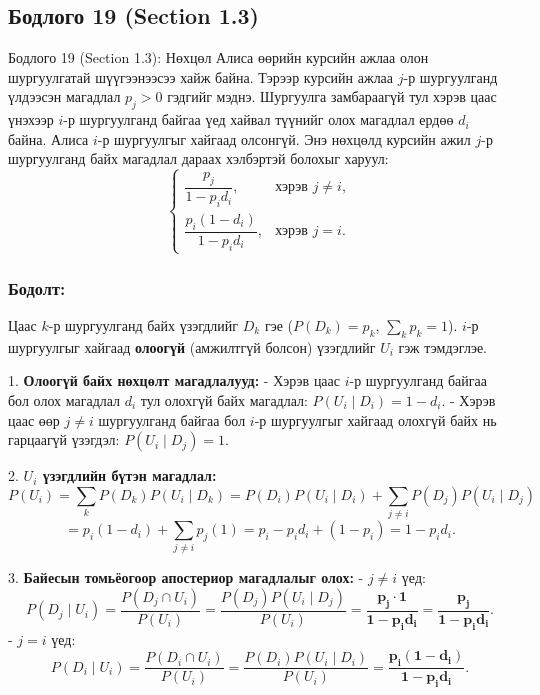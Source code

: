 \documentclass[11pt,a4paper]{article}
\begin{document}
\vspace{0.8em}

\subsection*{Бодлого 19 (Section 1.3)}

\begin{problembox}{Бодлого 19 (Section 1.3): Нөхцөл}
Алиса өөрийн курсийн ажлаа олон шургуулгатай шүүгээнээсээ хайж байна. Тэрээр курсийн ажлаа $j$-р шургуулганд үлдээсэн магадлал $p_j > 0$ гэдгийг мэднэ. Шургуулга замбараагүй тул хэрэв цаас үнэхээр $i$-р шургуулганд байгаа үед хайвал түүнийг олох магадлал ердөө $d_i$ байна. Алиса $i$-р шургуулгыг хайгаад олсонгүй. Энэ нөхцөлд курсийн ажил $j$-р шургуулганд байх магадлал дараах хэлбэртэй болохыг харуул:
\[
  \begin{cases} \dfrac{p_j}{1 - p_i d_i}, & \text{хэрэв } j \neq i, \\[12pt] \dfrac{p_i(1 - d_i)}{1 - p_i d_i}, & \text{хэрэв } j = i. \end{cases}
\]
\end{problembox}

\subsubsection*{Бодолт:}

Цаас $k$-р шургуулганд байх үзэгдлийг $D_k$ гэе ($P(D_k) = p_k$, $\sum_k p_k = 1$).
$i$-р шургуулгыг хайгаад 				\textbf{олоогүй} (амжилтгүй болсон) үзэгдлийг $U_i$ гэж тэмдэглэе.

1. 				\textbf{Олоогүй байх нөхцөлт магадлалууд:}
   - Хэрэв цаас $i$-р шургуулганд байгаа бол олох магадлал $d_i$ тул олохгүй байх магадлал: $P(U_i \mid D_i) = 1 - d_i$.
   - Хэрэв цаас өөр $j \neq i$ шургуулганд байгаа бол $i$-р шургуулгыг хайгаад олохгүй байх нь гарцаагүй үзэгдэл: $P(U_i \mid D_j) = 1$.

2. 				\textbf{$U_i$ үзэгдлийн бүтэн магадлал:}
   \[
     P(U_i) = \sum_k P(D_k) P(U_i \mid D_k) = P(D_i)P(U_i \mid D_i) + \sum_{j \neq i} P(D_j)P(U_i \mid D_j)
   \]
   \[
     = p_i(1 - d_i) + \sum_{j \neq i} p_j (1) = p_i - p_i d_i + (1 - p_i) = 1 - p_i d_i.
   \]

3. 				\textbf{Байесын томьёогоор апостериор магадлалыг олох:}
   - $j \neq i$ үед:
     \[
       P(D_j \mid U_i) = \frac{P(D_j \cap U_i)}{P(U_i)} = \frac{P(D_j)P(U_i \mid D_j)}{P(U_i)} = \mathbf{\frac{p_j \cdot 1}{1 - p_i d_i} = \frac{p_j}{1 - p_i d_i}}.
     \]
   - $j = i$ үед:
     \[
       P(D_i \mid U_i) = \frac{P(D_i \cap U_i)}{P(U_i)} = \frac{P(D_i)P(U_i \mid D_i)}{P(U_i)} = \mathbf{\frac{p_i(1 - d_i)}{1 - p_i d_i}}.
     \]
\end{document}
